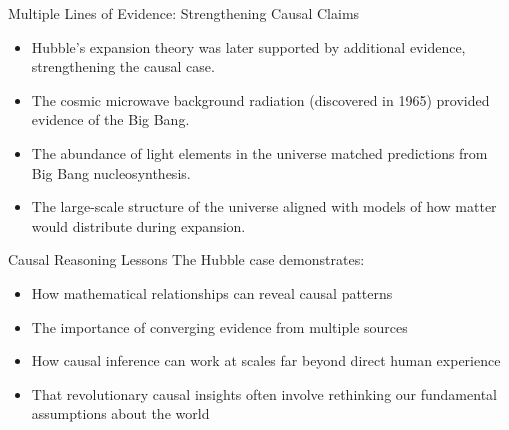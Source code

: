 \documentclass{beamer}
\begin{document}
\begin{frame}{Multiple Lines of Evidence: Strengthening Causal Claims}
    \begin{itemize}
        \item Hubble's expansion theory was later supported by additional evidence, strengthening the causal case.
        \item The cosmic microwave background radiation (discovered in 1965) provided evidence of the Big Bang.
        \item The abundance of light elements in the universe matched predictions from Big Bang nucleosynthesis.
        \item The large-scale structure of the universe aligned with models of how matter would distribute during expansion.
    \end{itemize}
    
    \begin{alertblock}{Causal Reasoning Lessons}
        The Hubble case demonstrates:
        \begin{itemize}
            \item How mathematical relationships can reveal causal patterns
            \item The importance of converging evidence from multiple sources
            \item How causal inference can work at scales far beyond direct human experience
            \item That revolutionary causal insights often involve rethinking our fundamental assumptions about the world
        \end{itemize}
    \end{alertblock}
\end{frame}
\end{document}
